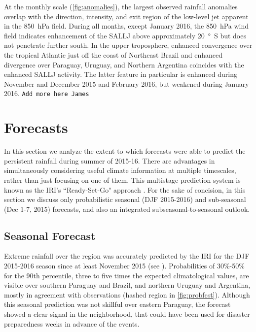 \documentclass[twocol]{ametsoc}
\begin{document}
At the monthly scale (\cref{fig:anomalies}), the largest observed rainfall anomalies overlap with the direction, intensity, and exit region of the low-level jet apparent in the \SI{850}{\hecto\pascal} field.
During all months, except January 2016, the \SI{850}{\hecto\pascal} wind field indicates enhancement of the SALLJ above approximately \SI{20}{\degree S} but does not penetrate further south.
In the upper troposphere, enhanced convergence over the tropical Atlantic just off the coast of Northeast Brazil and enhanced divergence over Paraguay, Uruguay, and Northern Argentina coincides with the enhanced SALLJ activity.
The latter feature in particular is enhanced during November and December 2015 and February 2016, but weakened during January 2016.
\texttt{Add more here James}

\section{Forecasts} \label{sec:fcsts}

In this section we analyze the extent to which forecasts were able to predict the persistent rainfall during summer of 2015-16. There are advantages in simultaneously considering useful climate information at multiple timescales, rather than just focusing on one of them. This multistage prediction system is known as the IRI's ``Ready-Set-Go" approach \citep{Goddard:2014kf,Munoz2016}.
For the sake of concision, in this section we discuss only probabilistic seasonal (DJF 2015-2016) and sub-seasonal (Dec 1-7, 2015) forecasts, and also an integrated subseasonal-to-seasonal outlook.

\subsection{Seasonal Forecast}

Extreme rainfall over the region was accurately predicted by the IRI for the DJF 2015-2016 season since at least November 2015 (see ). Probabilities of 30\%-50\% for the 90th percentile, three to five times the expected climatological values, are visible over southern Paraguay and Brazil, and northern Uruguay and Argentina, mostly in agreement with observations (hashed region in \cref{fig:probfcst}).
Although this seasonal prediction was not skillful over eastern Paraguay, the forecast  showed a clear signal in the neighborhood, that could have been used for disaster-preparedness weeks in advance of the events.
\end{document}
